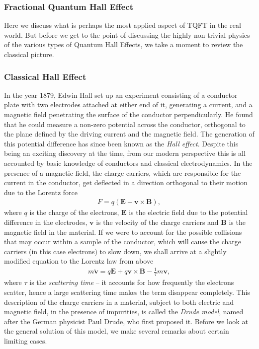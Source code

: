         \subsubsection{Fractional Quantum Hall Effect} \label{FQHE_sec}
        Here we discuss what is perhaps the most applied aspect of TQFT in the real world. But before we get to the point of discussing the highly non-trivial physics of the various types of Quantum Hall Effects, we take a moment to review the classical picture.
        \subsubsection*{Classical Hall Effect}
        In the year 1879, Edwin Hall set up an experiment consisting of a conductor plate with two electrodes attached at either end of it, generating a current, and a magnetic field penetrating the surface of the conductor perpendicularly. He found that he could measure a non-zero potential across the conductor, orthogonal to the plane defined by the driving current and the magnetic field. The generation of this potential difference has since been known as the \textit{Hall effect}. Despite this being an exciting discovery at the time, from our modern perspective this is all accounted by basic knowledge of conductors and classical electrodynamics. In the presence of a magnetic field, the charge carriers, which are responsible for the current in the conductor, get deflected in a direction orthogonal to their motion due to the Lorentz force
        \begin{align}
            F = q(\bm{E} + \bm{v}\times \bm{B}),
        \end{align}
        where $q$ is the charge of the electrons, $\bm{E}$ is the electric field due to the potential difference in the electrodes, $\bm{v}$ is the velocity of the charge carriers and $\bm{B}$ is the magnetic field in the material. If we were to account for the possible collisions that may occur within a sample of the conductor, which will cause the charge carriers (in this case electrons) to slow down, we shall arrive at a slightly modified equation to the Lorentz law from above
        \begin{align}
            m \dot{\bm{v}} = q \bm{E}+q \bm{v}\times \bm{B} - \frac{1}{\tau} m \bm{v}, \label{eq:Drude_Model_Background}
        \end{align}
        where $\tau$ is the \textit{scattering time} -- it accounts for how frequently the electrons scatter, hence a large scattering time makes the term disappear completely. This description of the charge carriers in a material, subject to both electric and magnetic field, in the presence of impurities, is called the \textit{Drude model}, named after the German physicist Paul Drude, who first proposed it. Before we look at the general solution of this model, we make several remarks about certain limiting cases.

